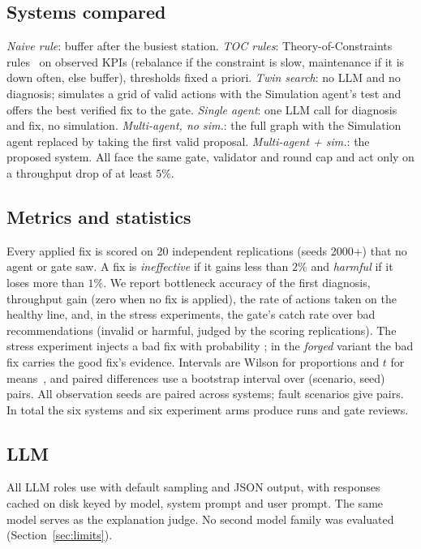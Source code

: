 \documentclass[conference]{IEEEtran}
\begin{document}
\subsection{Systems compared}
\emph{Naive rule}: buffer after the busiest station. \emph{TOC rules}: Theory-of-Constraints
rules~\cite{goldratt1984} on observed KPIs (rebalance if the constraint is slow, maintenance if it is down
often, else buffer), thresholds fixed a priori. \emph{Twin search}: no LLM and no diagnosis; simulates a grid of
\TwinGrid{} valid actions with the Simulation agent's test and offers the best verified fix to the gate.
\emph{Single agent}: one LLM call for diagnosis and fix, no simulation. \emph{Multi-agent, no sim.}: the full
graph with the Simulation agent replaced by taking the first valid proposal. \emph{Multi-agent + sim.}: the
proposed system. All face the same gate, validator and round cap and act only on a throughput drop of at least $5\%$.

\subsection{Metrics and statistics}
Every applied fix is scored on 20 independent replications (seeds 2000+) that no agent or gate saw. A fix is
\emph{ineffective} if it gains less than $2\%$ and \emph{harmful} if it loses more than $1\%$. We report
bottleneck accuracy of the first diagnosis, throughput gain (zero when no fix is applied), the rate of actions
taken on the healthy line, and, in the stress experiments, the gate's catch rate over bad recommendations
(invalid or harmful, judged by the scoring replications). The stress experiment injects a bad fix with
probability \BadRate{}; in the \emph{forged} variant the bad fix carries the good fix's evidence. Intervals are
Wilson for proportions and $t$ for means~\cite{wilson1927}, and paired differences use a bootstrap interval over
(scenario, seed) pairs. All \Nseeds{} observation seeds are paired across systems; fault scenarios give
\Npairs{} pairs. In total the six systems and six experiment arms produce \NRuns{} runs and \NReviews{} gate
reviews.

\subsection{LLM}
All LLM roles use \Model{} with default sampling and JSON output, with responses cached on disk keyed by
model, system prompt and user prompt. The same model serves as the explanation judge. No second model family
was evaluated (Section~\ref{sec:limits}).
\end{document}
